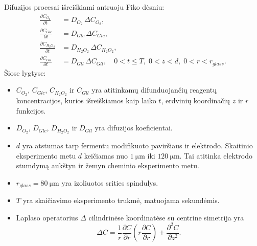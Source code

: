 Difuzijos procesai išreiškiami antruoju Fiko dėsniu:
\begin{equation}
  \begin{aligned}\label{eq:santr_eq1}
  \frac{\partial C_{O_2}}{\partial t} &= D_{O_2}\,\Delta C_{O_2},\\
  \frac{\partial C_{Glc}}{\partial t} &= D_{Glc}\,\Delta C_{Glc},\\
  \frac{\partial C_{H_2 O_2}}{\partial t} &= D_{H_2 O_2} \,\Delta C_{H_2 O_2},\\
  \frac{\partial C_{Gll}}{\partial t} &= D_{Gll}\,\Delta C_{Gll},  \quad 0<t\leq T,\; 0<z<d,\; 0<r<r_{glass}.
  \end{aligned}
\end{equation}
Šiose lygtyse:
\begin{itemize}
  \item[] $C_{O_2}$, $C_{Glc}$, $C_{H_2 O_2}$ ir $C_{Gll}$ yra atitinkamų difunduojančių re\-a\-gen\-tų koncentracijos, kurios išreiškiamos kaip laiko $t$, er\-dvi\-nių ko\-or\-di\-na\-čių $z$ ir $r$ funkcijos. 
  \item[] $D_{O_2}$, $D_{Glc}$, $D_{H_2 O_2}$ ir $D_{Gll}$ yra difuzijos koeficientai.
  \item[] $d$ yra atstumas tarp fermentu modifikuoto paviršiaus ir elektrodo. Skaitinio eksperimento metu $d$ keičiamas nuo $\SI{1}{\um}$ iki $\SI{120}{\um}$. Tai atitinka elektrodo stumdymą aukštyn ir žemyn cheminio eksperimento metu.
  \item[] $r_{glass} = \SI{80}{\um}$ yra izoliuotos srities spindulys.
  \item[] $T$ yra skaičiavimo eksperimento trukmė, matuojama sekundėmis.
  \item[] Laplaso operatorius $\Delta$ cilindrinėse koordinatėse su centrine simetrija yra
  \begin{equation*}
  \Delta C = \frac{1}{r}\frac{\partial C }{\partial r} \left( r\frac{\partial C }{\partial r} \right) + \frac{\partial^{2} C}{\partial z^{2}}.
  \end{equation*}
\end{itemize}
